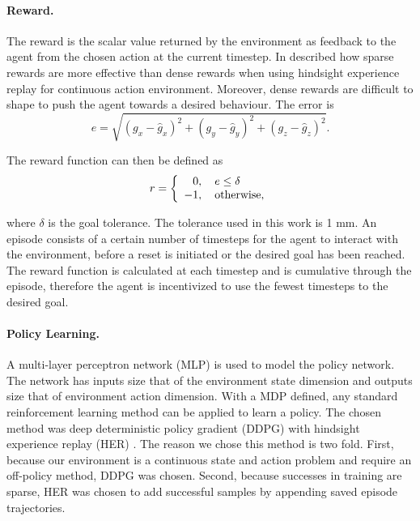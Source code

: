 \paragraph{Reward.} The reward is the scalar value returned by the environment as feedback to the agent from the chosen action at the current timestep. In \cite{andrychowicz2017hindsight} described how sparse rewards are more effective than dense rewards when using hindsight experience replay for continuous action environment. Moreover, dense rewards are difficult to shape to push the agent towards a desired behaviour. The error is
\begin{equation}
e = \sqrt{(g_x - \hat{g}_x)^2 + (g_y - \hat{g}_y)^2 + (g_z - \hat{g}_z)^2}. \label{eqn:7}
\end{equation}

The reward function can then be defined as
\begin{equation}
r =
  \left\{
    \begin{array}{l}
      \hphantom{-}0, \quad e \leq \delta \\
      -1, \quad \textnormal{otherwise},
    \end{array}
  \right. \label{eqn:8}
\end{equation}

where $\delta$ is the goal tolerance. The tolerance used in this work is 1 mm. An episode consists of a certain number of timesteps for the agent to interact with the environment, before a reset is initiated or the desired goal has been reached. The reward function is calculated at each timestep and is cumulative through the episode, therefore the agent is incentivized to use the fewest timesteps to the desired goal.

\paragraph{Policy Learning.} A multi-layer perceptron network (MLP) is used to model the policy network. The network has inputs size that of the environment state dimension and outputs size that of environment action dimension. With a MDP defined, any standard reinforcement learning method can be applied to learn a policy. The chosen method was deep deterministic policy gradient (DDPG) \cite{Lillicrap2015} with hindsight experience replay (HER) \cite{andrychowicz2017hindsight}. The reason we chose this method is two fold. First, because our environment is a continuous state and action problem and require an off-policy method, DDPG was chosen. Second, because successes in training are sparse, HER was chosen to add successful samples by appending saved episode trajectories.

